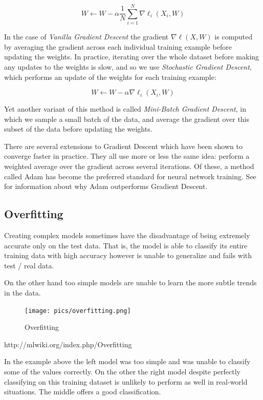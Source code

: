 \documentclass[twoside]{article}
\begin{document}
\begin{equation}
	W \leftarrow W - \alpha \frac{1}{N} \sum_{i=1}^{N} \nabla \ell_i(X_i,W)
\end{equation}

In the case of \textit{Vanilla Gradient Descent} the gradient $\nabla \ell(X,W)$ is computed by averaging the gradient across each individual training example before updating the weights. In practice, iterating over the whole dataset before making any updates to the weights is slow, and so we use \textit{Stochastic Gradient Descent}, which performs an update of the weights for each training example:

\begin{equation}
	W \leftarrow W - \alpha \nabla \ell_i(X_i,W)
\end{equation}

Yet another variant of this method is called \textit{Mini-Batch Gradient Descent}, in which we sample a small batch of the data, and average the gradient over this subset of the data before updating the weights.

There are several extensions to Gradient Descent which have been shown to converge faster in practice. They all use more or less the same idea: perform a weighted average over the gradient across several iterations. Of these, a method called Adam has become the preferred standard for neural network training. See \cite{cs231n-website} for information about why Adam outperforms Gradient Descent.

\subsection{Overfitting}
Creating complex models sometimes have the disadvantage of being extremely accurate only on the test data. That is, the model is able to classify its entire training data with high accuracy however is unable to generalize and fails with test / real data.

On the other hand too simple models are unable to learn the more subtle trends in the data.

\begin{figure}[!htb]
\centering
\texttt{[image: pics/overfitting.png]}
\caption{Overfitting\cite{}}
\label{fig:Overfitting}
\end{figure}
http://mlwiki.org/index.php/Overfitting

In the example above the left model was too simple and was unable to classify some of the values correctly. On the other the right model despite perfectly classifying on this training dataset is unlikely to perform as well in real-world situations. The middle offers a good classification.
\end{document}
